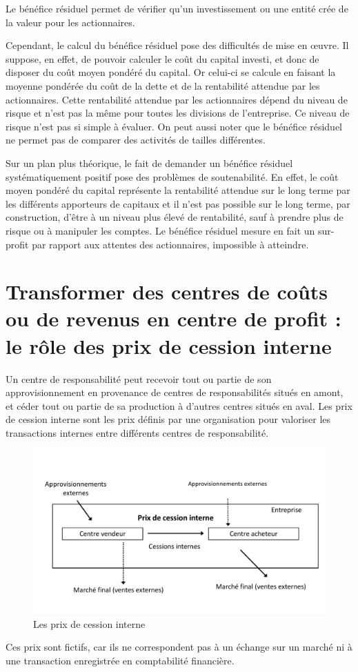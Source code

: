 \documentclass[oneside]{kaobook}
\begin{document}
Le bénéfice résiduel permet de vérifier qu'un investissement ou une entité crée de la valeur pour les actionnaires. 

Cependant, le calcul du bénéfice résiduel pose des difficultés de mise en œuvre. Il suppose, en effet, de pouvoir calculer le coût du capital investi, et donc de disposer du coût moyen pondéré du capital. Or celui-ci se calcule en faisant la moyenne pondérée du coût de la dette et de la rentabilité attendue par les actionnaires. Cette rentabilité attendue par les actionnaires dépend du niveau de risque et n'est pas la même pour toutes les divisions de l'entreprise. Ce niveau de risque n'est pas si simple à évaluer. On peut aussi noter que le bénéfice résiduel ne permet pas de comparer des activités de tailles différentes.

Sur un plan plus théorique, le fait de demander un bénéfice résiduel systématiquement positif pose des problèmes de soutenabilité. En effet, le coût moyen pondéré du capital représente la rentabilité attendue sur le long terme par les différents apporteurs de capitaux et il n'est pas possible sur le long terme, par construction, d'être à un niveau plus élevé de rentabilité, sauf à prendre plus de risque ou à manipuler les comptes. Le bénéfice résiduel mesure en fait un sur-profit par rapport aux attentes des actionnaires, impossible à atteindre.

\section{Transformer des centres de coûts ou de revenus en centre de profit : le rôle des prix de cession interne}
\label{sec:org6ad737d}
Un centre de responsabilité peut recevoir tout ou partie de son approvisionnement en provenance de centres de responsabilités situés en amont, et céder tout ou partie de sa production à d’autres centres situés en aval. Les prix de cession interne sont les prix définis par une organisation pour valoriser les transactions internes entre différents centres de responsabilité.

\begin{figure}[H]

\includegraphics{./img/pci.pdf}
\caption{Les prix de cession interne}
\end{figure}
Ces prix sont fictifs, car ils ne correspondent pas à un échange sur un marché ni à une transaction enregistrée en comptabilité financière.
\end{document}
